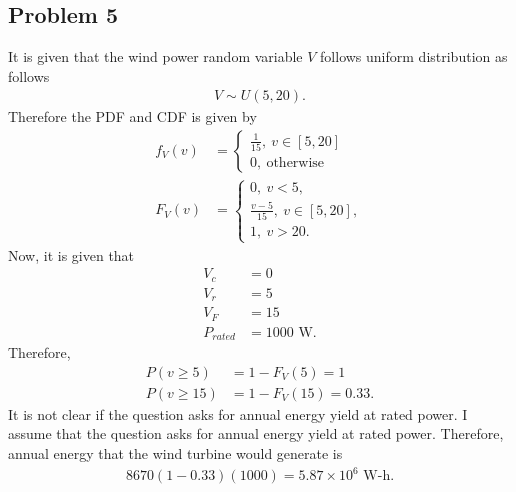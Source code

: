 \subsection*{Problem 5}
It is given that the wind power random variable $V$ follows uniform distribution as follows
\begin{align*}
	V \sim U(5,20).
\end{align*}
Therefore the PDF and CDF is given by
\begin{align*}
	f_V(v) &= \begin{cases}
		\frac{1}{15},\ v \in [5,20]\\
		0,\ \text{otherwise}
	\end{cases}\\
	F_V(v) &= \begin{cases}
		0,\ v < 5,\\
		\frac{v-5}{15},\ v \in [5,20],\\
		1,\ v > 20.
	\end{cases}
\end{align*}
Now, it is given that
\begin{align*}
	V_c &= 0\\
	V_r &= 5\\
	V_F &= 15\\
	P_{rated} &= 1000 \text{ W}.
\end{align*}
Therefore,
\begin{align*}
	P(v\geq 5) &= 1-F_V(5) = 1\\
	P(v \geq 15) &= 1-F_V(15) = 0.33.
\end{align*}
It is not clear if the question asks for annual energy yield at rated power. I assume that the question asks for annual energy yield at rated power. Therefore, annual energy that the wind turbine would generate is
\begin{align*}
	8670(1-0.33)(1000) = 5.87\times 10^6 \text{ W-h}.
\end{align*}